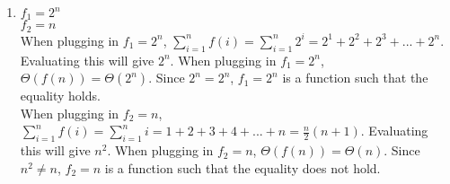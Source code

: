 \documentclass[11pt]{article}
\def\endproofmark{$\Box$}
\newenvironment{proof}{\par{\bf Proof:}}{\endproofmark\smallskip}
\begin{document}
\begin{enumerate}[label=(\alph*)]
\begin{enumerate}[label=(\roman*)]
\item
$f = \Theta(g)$.
\begin{proof}
This is because $\displaystyle{\lim_{n \to \infty} \frac{f(n)} {g(n)}} = \displaystyle{\lim_{n \to \infty} \frac{n + \log{n}} {n + (\log{n})^2}} = \displaystyle{\lim_{n \to \infty} \frac{1 + \frac{1} {n\ln{2}}} {1 + \frac{2\log{n}} {n\ln{2}}}} = \displaystyle{\lim_{n \to \infty} \frac{\frac{n\ln{2} + 1} {n\ln{2}}} {\frac{n\ln{2} + 2\log{n}} {n\ln{2}}}} = \displaystyle{\lim_{n \to \infty} \frac{n\ln{2} + 1} {n\ln{2} + 2\log{n}}} = \displaystyle{\lim_{n \to \infty} \frac{\ln{2}} {\ln{2} + \frac{2} {n\ln{2}}}} = \displaystyle{\lim_{n \to \infty} \frac{\ln{2}} {\frac{n(\ln{2})^2 + 2} {n\ln{2}}}} = \displaystyle{\lim_{n \to \infty} \frac{\ln{2}} {\frac{n(\ln{2})^2 + 2} {n\ln{2}}}} = \displaystyle{\lim_{n \to \infty} \frac{n(\ln{2})^2} {n(\ln{2})^2 + 2}} = \displaystyle{\lim_{n \to \infty} \frac{(\ln{2})^2} {(\ln{2})^2}} = 1$. Since this limit gives me a constant, then $f \in \Theta(g)$.
\end{proof}

\item
$f = O(g)$.
\begin{proof}
This is because $\displaystyle{\lim_{n \to \infty} \frac{f(n)} {g(n)}} = \displaystyle{\lim_{n \to \infty} \frac{\log{(n!)}} {n\log{n}}} = \displaystyle{\lim_{n \to \infty} \frac{\log{(n!)}} {\log{n^n}}} = \displaystyle{\lim_{n \to \infty} \frac{\log{({\prod\limits_{i = 1}^{n} i})}} {\log{({\prod\limits_{i = 1}^{n} n})}}} = \displaystyle{\lim_{n \to \infty} \frac{\log{(1 * 2 * 3 * ... * (n - 2) * (n - 1) * n)}} {\log{(n * n * n * ... * n * n * n)}}} = 0$. This gives $0$ because $n$ will always be greater than $(n - 1)$ so $\log{({\prod\limits_{i = 1}^{n} i})} \leq \log{({\prod\limits_{i = 1}^{n} n})}$ and therefore the numerator will always be smaller than or equal to the denominator. Since this limit gives me 0, then $f$ grows slower than $g$ and so $f \in O(g)$.
\end{proof}

\end{enumerate}

\item
$f_1 = 2^n$ \\
$f_2 = n$ \\
When plugging in $f_1 = 2^n$, $\sum\limits_{i = 1}^{n} f(i) = \sum\limits_{i = 1}^{n} 2^i = 2^1 + 2^2 + 2^3 + ... + 2^n$. Evaluating this will give $2^n$. When plugging in $f_1 = 2^n$, $\Theta(f(n)) = \Theta(2^n)$. Since $2^n = 2^n$, $f_1 = 2^n$ is a function such that the equality holds. \\
When plugging in $f_2 = n$, $\sum\limits_{i = 1}^{n} f(i) = \sum\limits_{i = 1}^{n} i = 1 + 2 + 3 + 4 + ... + n = \frac{n} {2} (n + 1)$. Evaluating this will give $n^2$. When plugging in $f_2 = n$, $\Theta(f(n)) = \Theta(n)$. Since $n^2 \neq n$, $f_2 = n$ is a function such that the equality does not hold.


\end{enumerate}
\end{document}
